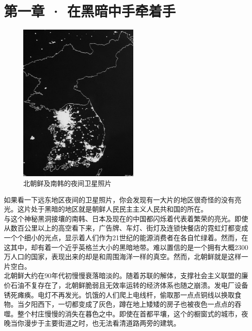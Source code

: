 \fancyhead[RO]{\thepage}
\fancyhead[LE]{\thepage}
\fancyfoot[LE,RO]{}
\fancyfoot[LO,CE]{}
\fancyfoot[CO,RE]{}
\chapter*{第一章 · 在黑暗中手牵着手}
\begin{figure}[!htbp]
	\centering
	\includegraphics[width=6cm]{./Chapters/Images/01.jpg}
	\caption*{北朝鲜及南韩的夜间卫星照片}
\end{figure}

如果看一下远东地区夜间的卫星照片，你会发现有一大片的地区很奇怪的没有亮光。这片处于黑暗的地区就是朝鲜人民民主主义人民共和国的所在。\\

与这个神秘黑洞接壤的南韩、日本及现在的中国都闪烁着代表着繁荣的亮光。即使从数百公里以上的高空看下来，广告牌、车灯、街灯及连锁快餐店的霓虹灯都变成一个个细小的光点，显示着人们作为21世纪的能源消费者在各自忙绿着。然而，在这其中，却有着一个近乎英格兰大小的黑暗地带。难以置信的是一个拥有大概2300万人口的国家，表现出来的却是和周围海洋一样的真空。然而，北朝鲜就是这样一片空白。\\

北朝鲜大约在90年代初慢慢衰落暗淡的。随着苏联的解体，支撑社会主义联盟的廉价石油不复存在了，北朝鲜脆弱且无效率运转的经济体系也随之崩溃。发电厂设备锈死瘫痪。电灯不再发光。饥饿的人们爬上电线杆，偷取那一点点铜线以换取食物。当夕阳西下，一切都变成了灰色，蹲在地上矮矮的房子也被夜色一点点的吞噬。整个村庄慢慢的消失在暮色之中。即使在首都平壤，这个的橱窗式的城市，夜晚当你漫步于主要街道之时，也无法看清道路两旁的建筑。\\

